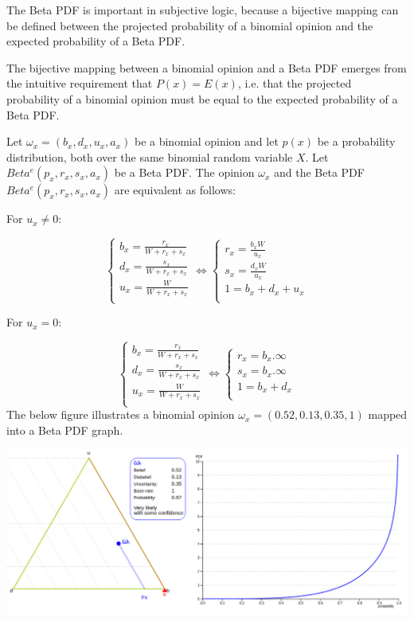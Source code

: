 \documentclass[UTF8]{article}
\newcommand{\opinion}[5]{$\omega_{#1} = (#2, #3, #4, #5)$}
\begin{document}
The Beta PDF is important in subjective logic, because a bijective mapping can
be defined between the projected probability of a binomial opinion and the expected
probability of a Beta PDF.

The bijective mapping between a binomial opinion and a Beta PDF emerges from
the intuitive requirement that $P(x) = E(x)$, i.e. that the projected probability of a
binomial opinion must be equal to the expected probability of a Beta PDF.

Let \opinion{x}{b_x}{d_x}{u_x}{a_x} be a binomial opinion and let $p(x)$ be a probability distribution, both over the same binomial random variable $X$. Let $Beta^e(p_x, r_x, s_x, a_x)$ be a Beta PDF. The opinion $\omega_x$ and the Beta PDF $Beta^e(p_x, r_x, s_x, a_x)$ are equivalent as follows:

For $u_x \neq 0$:

$$
\begin{cases}
    b_x = \frac{r_x}{W + r_x + s_x}\\
    d_x = \frac{s_x}{W + r_x + s_x}\\
    u_x = \frac{W}{W + r_x + s_x}\\
\end{cases}
\Leftrightarrow
\begin{cases}
    r_x = \frac{b_xW}{u_x}\\
    s_x = \frac{d_xW}{u_x}\\
    1 = b_x + d_x + u_x\\
\end{cases}
$$

For $u_x = 0$:

$$
\begin{cases}
    b_x = \frac{r_x}{W + r_x + s_x}\\
    d_x = \frac{s_x}{W + r_x + s_x}\\
    u_x = \frac{W}{W + r_x + s_x}\\
\end{cases}
\Leftrightarrow
\begin{cases}
    r_x = b_x . \infty\\
    s_x = b_x . \infty\\
    1 = b_x + d_x\\
\end{cases}
$$
The below figure illustrates a binomial opinion \opinion{x}{0.52}{0.13}{0.35}{1} mapped into a Beta PDF graph.
\begin{center}
\includegraphics[width=6in]{images/add1viz.png}
\end{center}
\end{document}

